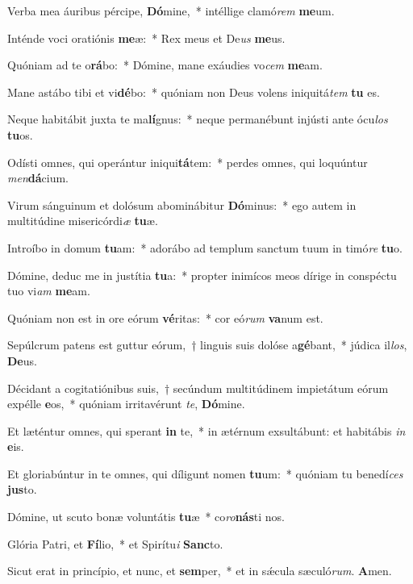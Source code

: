 \item Verba mea áuribus pércipe, \textbf{Dó}mine,~* intéllige clamó\textit{rem} \textbf{me}um.
\item Inténde voci oratiónis \textbf{me}æ:~* Rex meus et De\textit{us} \textbf{me}us.
\item Quóniam ad te o\textbf{rá}bo:~* Dómine, mane exáudies vo\textit{cem} \textbf{me}am.
\item Mane astábo tibi et vi\textbf{dé}bo:~* quóniam non Deus volens iniquitá\textit{tem} \textbf{tu} es.
\item Neque habitábit juxta te ma\textbf{lí}gnus:~* neque permanébunt injústi ante ócu\textit{los} \textbf{tu}os.
\item Odísti omnes, qui operántur iniqui\textbf{tá}tem:~* perdes omnes, qui loquúntur \textit{men}\textbf{dá}cium.
\item Virum sánguinum et dolósum abominábitur \textbf{Dó}minus:~* ego autem in multitúdine misericórdi\textit{æ} \textbf{tu}æ.
\item Introíbo in domum \textbf{tu}am:~* adorábo ad templum sanctum tuum in timó\textit{re} \textbf{tu}o.
\item Dómine, deduc me in justítia \textbf{tu}a:~* propter inimícos meos dírige in conspéctu tuo vi\textit{am} \textbf{me}am.
\item Quóniam non est in ore eórum \textbf{vé}ritas:~* cor eó\textit{rum} \textbf{va}num est.
\item Sepúlcrum patens est guttur eórum,~† linguis suis dolóse a\textbf{gé}bant,~* júdica il\textit{los}, \textbf{De}us.
\item Décidant a cogitatiónibus suis,~† secúndum multitúdinem impietátum eórum expélle \textbf{e}os,~* quóniam irritavérunt \textit{te}, \textbf{Dó}mine.
\item Et læténtur omnes, qui sperant \textbf{in} te,~* in ætérnum exsultábunt: et habitábis \textit{in} \textbf{e}is.
\item Et gloriabúntur in te omnes, qui díligunt nomen \textbf{tu}um:~* quóniam tu benedí\textit{ces} \textbf{jus}to.
\item Dómine, ut scuto bonæ voluntátis \textbf{tu}æ~* co\textit{ro}\textbf{nás}ti nos.
\item Glória Patri, et \textbf{Fí}lio,~* et Spirítu\textit{i} \textbf{Sanc}to.
\item Sicut erat in princípio, et nunc, et \textbf{sem}per,~* et in sǽcula sæculó\textit{rum}. \textbf{A}men.
